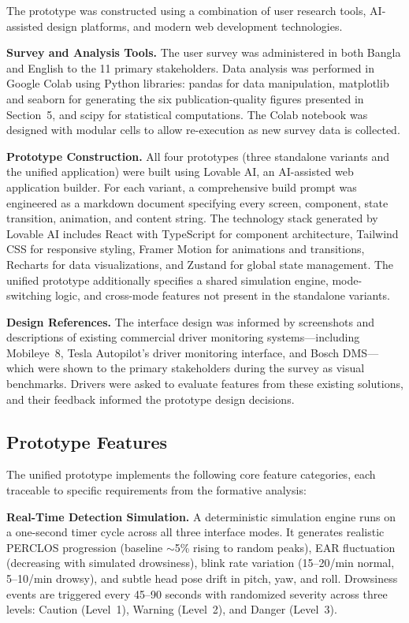 \documentclass[sigconf]{acmart}
\begin{document}
The prototype was constructed using a combination of user research tools, AI-assisted design platforms, and modern web development technologies.

\textbf{Survey and Analysis Tools.} The user survey was administered in both Bangla and English to the 11 primary stakeholders. Data analysis was performed in Google Colab using Python libraries: pandas for data manipulation, matplotlib and seaborn for generating the six publication-quality figures presented in Section~5, and scipy for statistical computations. The Colab notebook was designed with modular cells to allow re-execution as new survey data is collected.

\textbf{Prototype Construction.} All four prototypes (three standalone variants and the unified application) were built using Lovable AI, an AI-assisted web application builder. For each variant, a comprehensive build prompt was engineered as a markdown document specifying every screen, component, state transition, animation, and content string. The technology stack generated by Lovable AI includes React with TypeScript for component architecture, Tailwind CSS for responsive styling, Framer Motion for animations and transitions, Recharts for data visualizations, and Zustand for global state management. The unified prototype additionally specifies a shared simulation engine, mode-switching logic, and cross-mode features not present in the standalone variants.

\textbf{Design References.} The interface design was informed by screenshots and descriptions of existing commercial driver monitoring systems---including Mobileye~8, Tesla Autopilot's driver monitoring interface, and Bosch DMS---which were shown to the primary stakeholders during the survey as visual benchmarks. Drivers were asked to evaluate features from these existing solutions, and their feedback informed the prototype design decisions.

\subsection{Prototype Features}

The unified prototype implements the following core feature categories, each traceable to specific requirements from the formative analysis:

\textbf{Real-Time Detection Simulation.} A deterministic simulation engine 
runs on a one-second timer cycle across all three interface modes. It generates realistic PERCLOS progression (baseline $\sim$5\% rising to random peaks), EAR fluctuation (decreasing with simulated drowsiness), blink rate variation (15--20/min normal, 5--10/min drowsy), and subtle head pose drift in pitch, yaw, and roll. Drowsiness events are triggered every 45--90 seconds with randomized severity across three levels: Caution (Level~1), Warning (Level~2), and Danger (Level~3).
\end{document}

